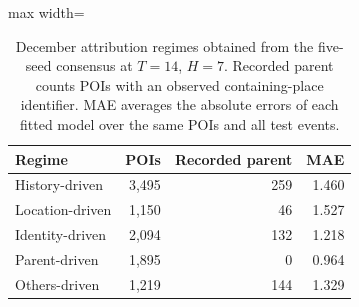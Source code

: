 \begin{table}[!htbp]
\centering
\begingroup
\singlespacing
\fontsize{9pt}{10.5pt}\selectfont
\setlength{\tabcolsep}{4pt}
\renewcommand{\arraystretch}{1.08}
\caption{December attribution regimes obtained from the five-seed consensus at $T=14$, $H=7$. Recorded parent counts POIs with an observed containing-place identifier. MAE averages the absolute errors of each fitted model over the same POIs and all test events.}
\label{tab:attri_regime}
\begin{adjustbox}{max width=\linewidth}
\begin{tabular}{lrrr}
\toprule
Regime & POIs & Recorded parent & MAE \\
\midrule
History-driven & 3,495 & 259 & 1.460 \\
Location-driven & 1,150 & 46 & 1.527 \\
Identity-driven & 2,094 & 132 & 1.218 \\
Parent-driven & 1,895 & 0 & 0.964 \\
Others-driven & 1,219 & 144 & 1.329 \\
\bottomrule
\end{tabular}
\end{adjustbox}
\endgroup
\end{table}

